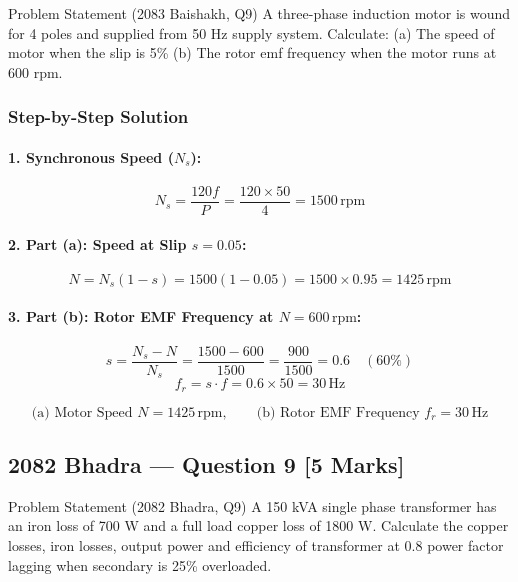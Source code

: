 \documentclass[11pt,a4paper,oneside]{article}
\begin{document}
\begin{questionbox}{Problem Statement (2083 Baishakh, Q9)}
A three-phase induction motor is wound for 4 poles and supplied from 50 Hz supply system. Calculate:
(a) The speed of motor when the slip is 5\%
(b) The rotor emf frequency when the motor runs at 600 rpm.
\end{questionbox}

\subsubsection*{Step-by-Step Solution}
\paragraph{1. Synchronous Speed ($N_s$):}
\[
N_s = \frac{120 f}{P} = \frac{120 \times 50}{4} = 1500\,\mathrm{rpm}
\]
\paragraph{2. Part (a): Speed at Slip $s = 0.05$:}
\[
N = N_s(1 - s) = 1500(1 - 0.05) = 1500 \times 0.95 = 1425\,\mathrm{rpm}
\]
\paragraph{3. Part (b): Rotor EMF Frequency at $N = 600\,\mathrm{rpm}$:}
\[
s = \frac{N_s - N}{N_s} = \frac{1500 - 600}{1500} = \frac{900}{1500} = 0.6 \quad (60\%)
\]
\[
f_r = s \cdot f = 0.6 \times 50 = 30\,\mathrm{Hz}
\]

\begin{answerbox}
\[
\text{(a) Motor Speed } N = 1425\,\mathrm{rpm}, \qquad \text{(b) Rotor EMF Frequency } f_r = 30\,\mathrm{Hz}
\]
\end{answerbox}

\newpage

\subsection{2082 Bhadra --- Question 9 [5 Marks]}

\begin{questionbox}{Problem Statement (2082 Bhadra, Q9)}
A 150 kVA single phase transformer has an iron loss of 700 W and a full load copper loss of 1800 W. Calculate the copper losses, iron losses, output power and efficiency of transformer at 0.8 power factor lagging when secondary is 25\% overloaded.
\end{questionbox}
\end{document}
